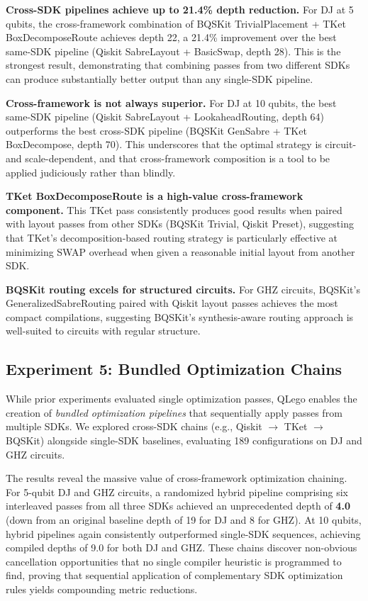 \documentclass[conference]{IEEEtran}
\begin{document}
\textbf{Cross-SDK pipelines achieve up to 21.4\% depth reduction.} For DJ at 5 qubits, the cross-framework combination of BQSKit TrivialPlacement + TKet BoxDecomposeRoute achieves depth 22, a 21.4\% improvement over the best same-SDK pipeline (Qiskit SabreLayout + BasicSwap, depth 28). This is the strongest result, demonstrating that combining passes from two different SDKs can produce substantially better output than any single-SDK pipeline.

\textbf{Cross-framework is not always superior.} For DJ at 10 qubits, the best same-SDK pipeline (Qiskit SabreLayout + LookaheadRouting, depth 64) outperforms the best cross-SDK pipeline (BQSKit GenSabre + TKet BoxDecompose, depth 70). This underscores that the optimal strategy is circuit- and scale-dependent, and that cross-framework composition is a tool to be applied judiciously rather than blindly.

\textbf{TKet BoxDecomposeRoute is a high-value cross-framework component.} This TKet pass consistently produces good results when paired with layout passes from other SDKs (BQSKit Trivial, Qiskit Preset), suggesting that TKet's decomposition-based routing strategy is particularly effective at minimizing SWAP overhead when given a reasonable initial layout from another SDK.

\textbf{BQSKit routing excels for structured circuits.} For GHZ circuits, BQSKit's GeneralizedSabreRouting paired with Qiskit layout passes achieves the most compact compilations, suggesting BQSKit's synthesis-aware routing approach is well-suited to circuits with regular structure.

\subsection{Experiment 5: Bundled Optimization Chains}

While prior experiments evaluated single optimization passes, QLego enables the creation of \textit{bundled optimization pipelines} that sequentially apply passes from multiple SDKs. We explored cross-SDK chains (e.g., Qiskit $\rightarrow$ TKet $\rightarrow$ BQSKit) alongside single-SDK baselines, evaluating 189 configurations on DJ and GHZ circuits.

The results reveal the massive value of cross-framework optimization chaining. For 5-qubit DJ and GHZ circuits, a randomized hybrid pipeline comprising six interleaved passes from all three SDKs achieved an unprecedented depth of \textbf{4.0} (down from an original baseline depth of 19 for DJ and 8 for GHZ). At 10 qubits, hybrid pipelines again consistently outperformed single-SDK sequences, achieving compiled depths of 9.0 for both DJ and GHZ. These chains discover non-obvious cancellation opportunities that no single compiler heuristic is programmed to find, proving that sequential application of complementary SDK optimization rules yields compounding metric reductions.
\end{document}
